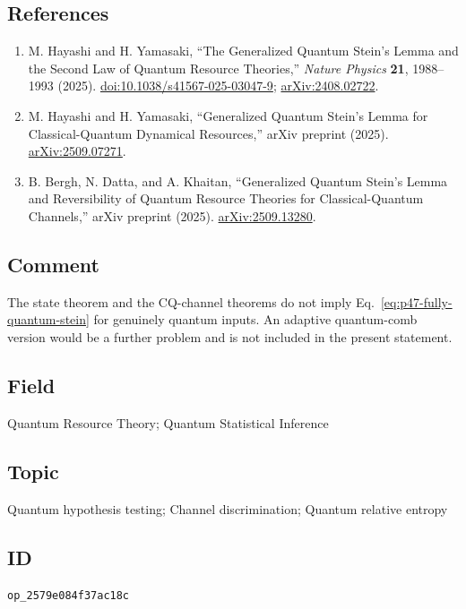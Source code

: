 \subsection*{References}

\begin{enumerate}[label={},leftmargin=4.8em,labelsep=0.5em]
  \footnotesize
  \item[\textup{[HY25a]}]\label{ref:p47-hayashi-yamasaki-state}
  M. Hayashi and H. Yamasaki,
  ``The Generalized Quantum Stein's Lemma and the Second Law of Quantum
  Resource Theories,'' \emph{Nature Physics} \textbf{21}, 1988--1993 (2025).
  \href{https://doi.org/10.1038/s41567-025-03047-9}{doi:10.1038/s41567-025-03047-9};
  \href{https://arxiv.org/abs/2408.02722}{arXiv:2408.02722}.

  \item[\textup{[HY25b]}]\label{ref:p47-hayashi-yamasaki-cq}
  M. Hayashi and H. Yamasaki,
  ``Generalized Quantum Stein's Lemma for Classical-Quantum Dynamical
  Resources,'' arXiv preprint (2025).
  \href{https://arxiv.org/abs/2509.07271}{arXiv:2509.07271}.

  \item[\textup{[BDK25]}]\label{ref:p47-bergh-datta-khaitan}
  B. Bergh, N. Datta, and A. Khaitan,
  ``Generalized Quantum Stein's Lemma and Reversibility of Quantum Resource
  Theories for Classical-Quantum Channels,'' arXiv preprint (2025).
  \href{https://arxiv.org/abs/2509.13280}{arXiv:2509.13280}.
\end{enumerate}

\subsection*{Comment}

The state theorem and the CQ-channel theorems do not imply
Eq.~\eqref{eq:p47-fully-quantum-stein} for genuinely quantum inputs.  An
adaptive quantum-comb version would be a further problem and is not included
in the present statement.

\subsection*{Field}

Quantum Resource Theory; Quantum Statistical Inference

\subsection*{Topic}

Quantum hypothesis testing; Channel discrimination; Quantum relative entropy

\subsection*{ID}

\texttt{op\_2579e084f37ac18c}
